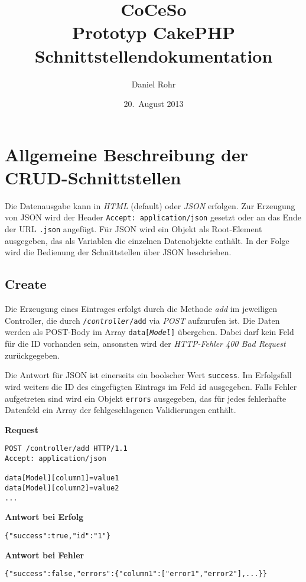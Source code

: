 \documentclass[a4paper,11pt]{article}
\title{CoCeSo\\Prototyp CakePHP\\Schnittstellendokumentation}
\author{Daniel Rohr}
\date{20.\ August 2013}
\newenvironment{code}[1][]{\smallskip\noindent\textbf{#1}}{}
\begin{document}
\maketitle
\tableofcontents
\pagebreak


\section{Allgemeine Beschreibung der CRUD-Schnittstellen}

Die Datenausgabe kann in \emph{HTML} (default) oder \emph{JSON} erfolgen. Zur Erzeugung von JSON wird der Header \texttt{Accept: application/json} gesetzt oder an das Ende der URL \texttt{.json} angefügt.
Für JSON wird ein Objekt als Root-Element ausgegeben, das als Variablen die einzelnen Datenobjekte enthält. In der Folge wird die Bedienung der Schnittstellen über JSON beschrieben.

\subsection{Create}

Die Erzeugung eines Eintrages erfolgt durch die Methode \emph{add} im jeweiligen Controller, die durch \texttt{/\emph{controller}/add} via \emph{POST} aufzurufen ist. Die Daten werden als POST-Body im Array \texttt{data[\emph{Model}]} übergeben. Dabei darf kein Feld für die ID vorhanden sein, ansonsten wird der \emph{HTTP-Fehler 400 Bad Request} zurückgegeben.

Die Antwort für JSON ist einerseits ein boolscher Wert \texttt{success}. Im Erfolgsfall wird weiters die ID des eingefügten Eintrags im Feld \texttt{id} ausgegeben. Falls Fehler aufgetreten sind wird ein Objekt \texttt{errors} ausgegeben, das für jedes fehlerhafte Datenfeld ein Array der fehlgeschlagenen Validierungen enthält.

\begin{code}[Request]
\begin{lstlisting}
POST /controller/add HTTP/1.1
Accept: application/json

data[Model][column1]=value1
data[Model][column2]=value2
...
\end{lstlisting}
\end{code}
\begin{code}[Antwort bei Erfolg]
\begin{lstlisting}
{"success":true,"id":"1"}
\end{lstlisting}
\end{code}
\begin{code}[Antwort bei Fehler]
\begin{lstlisting}
{"success":false,"errors":{"column1":["error1","error2"],...}}
\end{lstlisting}
\end{code}
\end{document}
